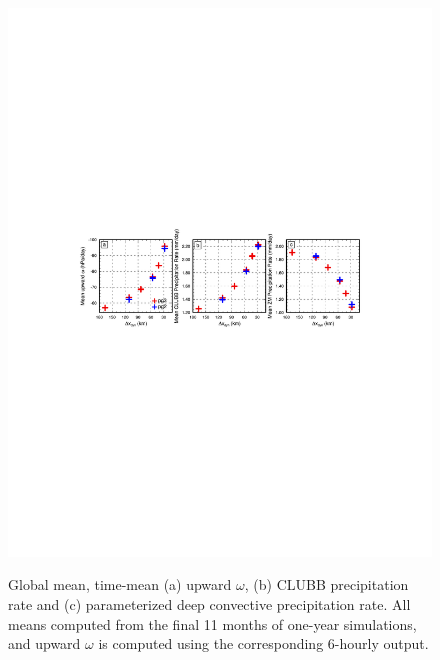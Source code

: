 \documentclass{agujournal}
\begin{document}
\begin{figure}[t]
\begin{center}
\noindent\includegraphics[width=30pc,angle=0]{figs/panel_diags.pdf}\\
\end{center}
\caption{Global mean, time-mean (a) upward $\omega$, (b) CLUBB precipitation rate and (c) parameterized deep convective precipitation rate. All means computed from the final 11 months of one-year simulations, and upward $\omega$ is computed using the corresponding 6-hourly output.}
\label{fig:diags}
\end{figure}
\end{document}

